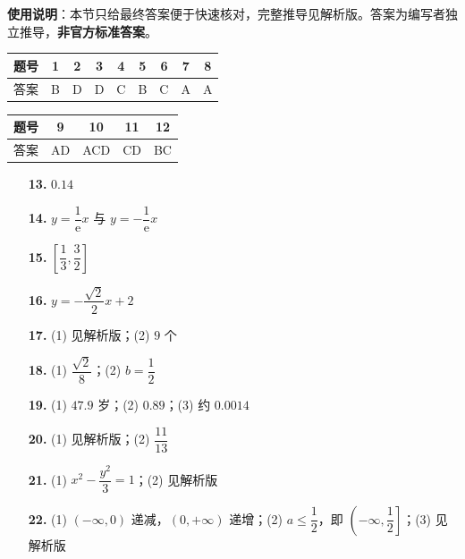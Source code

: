 
\begin{gknotice}
\textbf{使用说明}：本节只给最终答案便于快速核对，完整推导见解析版。答案为编写者独立推导，\textbf{非官方标准答案}。
\end{gknotice}

\begin{center}\begin{tabular}{ccccccccc}
\toprule
题号 & 1 & 2 & 3 & 4 & 5 & 6 & 7 & 8 \\
\midrule
答案 & B & D & D & C & B & C & A & A \\
\bottomrule
\end{tabular}\end{center}

\begin{center}\begin{tabular}{ccccc}
\toprule
题号 & 9 & 10 & 11 & 12 \\
\midrule
答案 & AD & ACD & CD & BC \\
\bottomrule
\end{tabular}\end{center}

\begin{itemize}[leftmargin=2.6em]
  \item[\textbf{13.}] $0.14$
  \item[\textbf{14.}] $y=\dfrac1{\mathrm e}x$ 与 $y=-\dfrac1{\mathrm e}x$
  \item[\textbf{15.}] $\left[\dfrac13,\dfrac32\right]$
  \item[\textbf{16.}] $y=-\dfrac{\sqrt2}2x+2$
\end{itemize}

\begin{itemize}[leftmargin=2.6em]
  \item[\textbf{17.}] (1) 见解析版；(2) $9$ 个
  \item[\textbf{18.}] (1) $\dfrac{\sqrt2}8$；(2) $b=\dfrac12$
  \item[\textbf{19.}] (1) $47.9$ 岁；(2) $0.89$；(3) 约 $0.0014$
  \item[\textbf{20.}] (1) 见解析版；(2) $\dfrac{11}{13}$
  \item[\textbf{21.}] (1) $x^{2}-\dfrac{y^{2}}3=1$；(2) 见解析版
  \item[\textbf{22.}] (1) $(-\infty,0)$ 递减，$(0,+\infty)$ 递增；(2) $a\le\dfrac12$，即 $\left(-\infty,\dfrac12\right]$；(3) 见解析版
\end{itemize}

